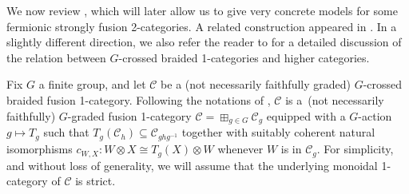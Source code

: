 \documentclass[10pt,a4paper]{amsart}
\numberwithin{equation}{section}
\begin{document}
We now review \cite[Construction~2.1.23]{DR}, which will later allow us to give very concrete models for some fermionic strongly fusion 2-categories. A related construction appeared in \cite[Section~6]{Cui}. In a slightly different direction, we also refer the reader to \cite{JPR} for a detailed discussion of the relation between $G$-crossed braided 1-categories and higher categories.

\begin{Construction}\label{con:gradedF2CfromCBF1C}
Fix $G$ a finite group, and let $\mathcal{C}$ be a (not necessarily faithfully graded) $G$-crossed braided fusion 1-category. Following the notations of \cite[Section~8.24]{EGNO}, $\mathcal{C}$ is a~(not necessarily faithfully) $G$-graded fusion 1-category $\mathcal{C}=\boxplus_{g\in G}\mathcal{C}_g$ equipped with a $G$-action~${g\mapsto T_g}$ such that $T_g(\mathcal{C}_h)\subseteq \mathcal{C}_{ghg^{-1}}$ together with suitably coherent natural isomorphisms $c_{W,X}\colon W\otimes X\cong T_g(X)\otimes W$ whenever $W$ is in $\mathcal{C}_g$. For simplicity, and without loss of generality, we will assume that the underlying monoidal 1-category of $\mathcal{C}$ is strict.


\end{Construction}
\end{document}
